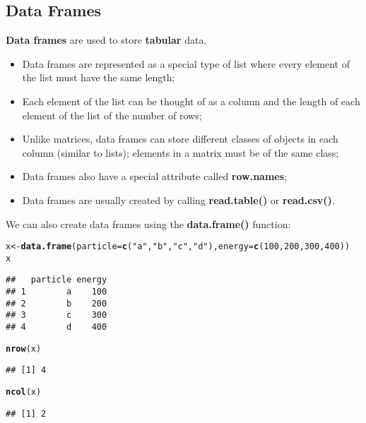 \documentclass[10pt,a4paper,twoside]{article}\usepackage[]{graphicx}\usepackage[]{xcolor}
\makeatletter
\newcommand{\hlnum}[1]{\textcolor[rgb]{0.686,0.059,0.569}{#1}}%
\newcommand{\hlsng}[1]{\textcolor[rgb]{0.192,0.494,0.8}{#1}}%
\newcommand{\hldef}[1]{\textcolor[rgb]{0.345,0.345,0.345}{#1}}%
\newcommand{\hlkwb}[1]{\textcolor[rgb]{0.69,0.353,0.396}{#1}}%
\newcommand{\hlkwc}[1]{\textcolor[rgb]{0.333,0.667,0.333}{#1}}%
\newcommand{\hlkwd}[1]{\textcolor[rgb]{0.737,0.353,0.396}{\textbf{#1}}}%
\newenvironment{kframe}{%
 \def\at@end@of@kframe{}%
 \ifinner\ifhmode%
  \def\at@end@of@kframe{\end{minipage}}%
  \begin{minipage}{\columnwidth}%
 \fi\fi%
 \def\FrameCommand##1{\hskip\@totalleftmargin \hskip-\fboxsep
 \colorbox{shadecolor}{##1}\hskip-\fboxsep
     \hskip-\linewidth \hskip-\@totalleftmargin \hskip\columnwidth}%
 \MakeFramed {\advance\hsize-\width
   \@totalleftmargin\z@ \linewidth\hsize
   \@setminipage}}%
 {\par\unskip\endMakeFramed%
 \at@end@of@kframe}
\newenvironment{knitrout}{}{} %
\makeatother
\begin{document}
\subsection{Data Frames}

\textbf{Data frames} are used to store \textbf{tabular} data.

\begin{itemize}
  \item Data frames are represented as a special type of list where every element of the list must have the same length;
  \item Each element of the list can be thought of as a column and the length of each element of the list of the number of rows;
  \item Unlike matrices, data frames can store different classes of objects in each column (similar to lists); elements in a matrix must be of the same class;
  \item Data frames also have a special attribute called \textbf{row.names};
  \item Data frames are usually created by calling \textbf{read.table()} or \textbf{read.csv()}.
\end{itemize}

We can also create data frames using the \textbf{data.frame()} function:

\begin{knitrout}
\color{fgcolor}\begin{kframe}
\begin{alltt}
\hldef{x} \hlkwb{<-} \hlkwd{data.frame}\hldef{(}\hlkwc{particle} \hldef{=} \hlkwd{c}\hldef{(}\hlsng{"a"}\hldef{,} \hlsng{"b"}\hldef{,} \hlsng{"c"}\hldef{,} \hlsng{"d"}\hldef{),} \hlkwc{energy} \hldef{=} \hlkwd{c}\hldef{(}\hlnum{100}\hldef{,} \hlnum{200}\hldef{,} \hlnum{300}\hldef{,} \hlnum{400}\hldef{))}
\hldef{x}
\end{alltt}
\begin{verbatim}
##   particle energy
## 1        a    100
## 2        b    200
## 3        c    300
## 4        d    400
\end{verbatim}
\begin{alltt}
\hlkwd{nrow}\hldef{(x)}
\end{alltt}
\begin{verbatim}
## [1] 4
\end{verbatim}
\begin{alltt}
\hlkwd{ncol}\hldef{(x)}
\end{alltt}
\begin{verbatim}
## [1] 2
\end{verbatim}
\end{kframe}
\end{knitrout}
\end{document}
